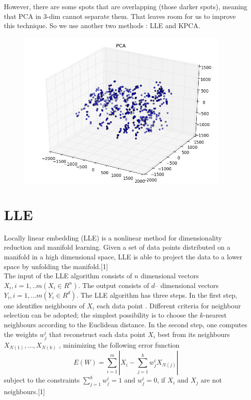 \documentclass{article}
\begin{document}
However, there are some spots that are overlapping (those darker spots), meaning that PCA in 3-dim cannot separate them. That leaves room for us to improve this technique. So we use another two methods : LLE and KPCA.

\begin{figure}[H]
\centering
\includegraphics[width=0.8\linewidth, height=8cm]{pca1}
\caption{}
\label{fig:larynx}
\end{figure}

\section{LLE}

Locally linear embedding (LLE) is a nonlinear
method for dimensionality reduction and manifold
learning. Given a set of data points distributed on
a manifold in a high dimensional space, LLE is able to
project the data to a lower space by unfolding the 
manifold.[1]\\


The input of the LLE algorithm consists of $n$
dimensional vectors$X_i,i=1,..m (X_i \in  R^n)$.  The
output consists of $d$– dimensional vectors
$Y_i,i=1,...m (Y_i \in  R^d)$. The LLE algorithm has three
steps. In the first step, one identifies neighbours of $X_i$
each data point . Different criteria for neighbour
selection can be adopted; the simplest possibility is to
choose the $k$-nearest neighbours according to the
Euclidean distance. In the second step, one computes
the weights $w_j^i$ that reconstruct each data point $X_i$
best from its neighbours $X_{N(1)},...,X_{N(k)}$ , minimizing
the following error function
\begin{equation}
E(W)=\sum_{i=1}^m |X_i-\sum_{j=1}^k w_j^iX_{N(j)}|
\end{equation}
subject to the constraints $\sum_{j=1}^k w_j^i =1$ and $w_j^i=0$, if $X_i$ and $X_j$ are not neighbours.[1] \\
\end{document}
